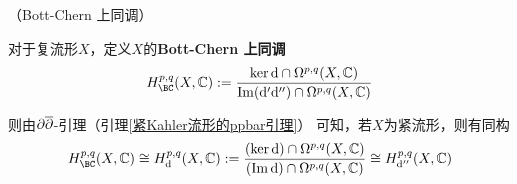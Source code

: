 
\begin{rem}（Bott-Chern 上同调）

对于复流形$X$，定义$X$的\textbf{Bott-Chern 上同调}
$$
  H^{p,q}_{\BC}(X,\bbC)
:=
  \frac{\ker\td\cap\Omg^{p,q}(X,\bbC)}
       {\im(\td'\td'')\cap\Omg^{p,q}(X,\bbC)}
$$
\end{rem}

则由$\partial\overline{\partial}$-引理（引理\ref{紧Kahler流形的ppbar引理}）
可知，若$X$为紧\Kahler 流形，则有同构
$$
  H^{p,q}_{\BC}(X,\bbC)
\cong
  H^{p,q}_{\td}(X,\bbC)
:=\frac{(\ker\td)\cap\Omg^{p,q}(X,\bbC)}
       {(\im\td)\cap\Omg^{p,q}(X,\bbC)}
\cong
  H^{p,q}_{\td''}(X,\bbC)
$$

